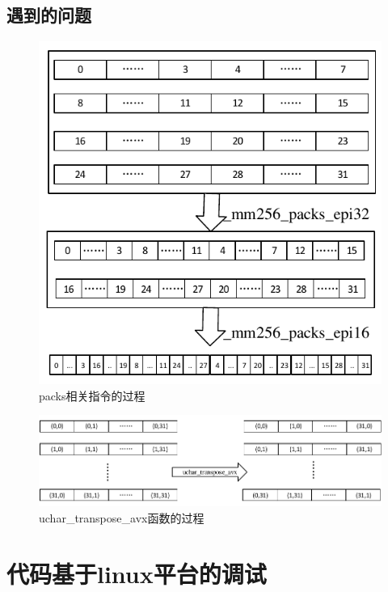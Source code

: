 \documentclass{article}
\begin{document}
\subsection{遇到的问题}
\begin{figure}[H]
	\centering
	\includegraphics[width = .8\textwidth]{packs.pdf}
	\caption{packs相关指令的过程}
\end{figure}
\begin{figure}[H]
	\centering
	\includegraphics[width = \textwidth]{unpack.pdf}
	\caption{uchar\_transpose\_avx函数的过程}
\end{figure}

\section{代码基于linux平台的调试}
\end{document}
